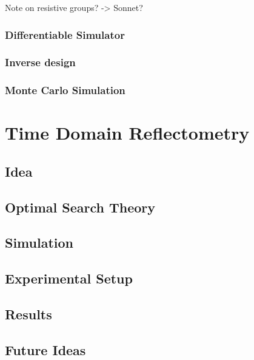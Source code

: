 \documentclass{article}
\begin{document}
Note on resistive groups? -> Sonnet?

\subsubsection{Differentiable Simulator}

\subsubsection{Inverse design}

\subsubsection{Monte Carlo Simulation}

\section{Time Domain Reflectometry}

\subsection{Idea}

\subsection{Optimal Search Theory}

\subsection{Simulation}

\subsection{Experimental Setup}

\subsection{Results}

\subsection{Future Ideas}
\end{document}
